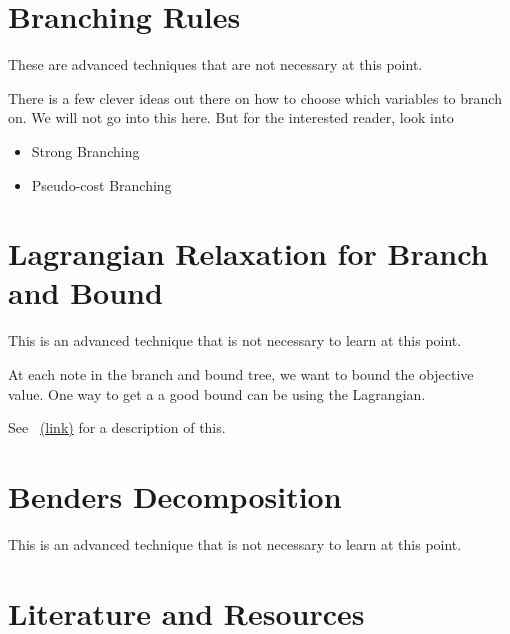 

\section{Branching Rules}
These are advanced techniques that are not necessary at this point.

There is a few clever ideas out there on how to choose which variables to branch on.  We will not go into this here.  But for the interested reader, look into 
\begin{itemize}
\item Strong Branching
\item Pseudo-cost Branching
\end{itemize}

\section{Lagrangian Relaxation for Branch and Bound}
This is an advanced technique that is not necessary to learn at this point.

At each note in the branch and bound tree, we want to bound the objective value.  One way to get a a good bound can be using the Lagrangian. 

See~\cite{Fisher2004}  \href{https://my.eng.utah.edu/~kalla/phy_des/lagrange-relax-tutorial-fisher.pdf}{(link)} for a description of this.




\section{Benders Decomposition}
This is an advanced technique that is not necessary to learn at this point.

\section{Literature and Resources}


